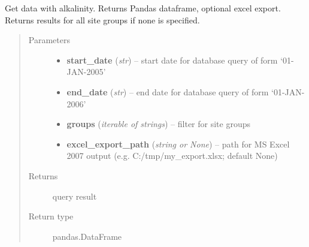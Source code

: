 \documentclass[letterpaper,10pt,english]{sphinxmanual}
\begin{document}
\begin{fulllineitems}
\begin{fulllineitems}
\begin{quote}
\begin{description}
\end{description}\end{quote}

\end{fulllineitems}


\begin{fulllineitems}
\label{modules:webb_utils.retrieve_data.RetrieveData.get_data_with_alkalinity}
Get data with alkalinity. Returns Pandas dataframe, optional excel export.
Returns results for all site groups if none is specified.
\begin{quote}\begin{description}
\item[{Parameters}] \leavevmode\begin{itemize}
\item {} 
\textbf{start\_date} (\emph{str}) -- start date for database query of form `01-JAN-2005'

\item {} 
\textbf{end\_date} (\emph{str}) -- end date for database query of form `01-JAN-2006'

\item {} 
\textbf{groups} (\emph{iterable of strings}) -- filter for site groups

\item {} 
\textbf{excel\_export\_path} (\emph{string or None}) -- path for MS Excel 2007 output (e.g. C:/tmp/my\_export.xlsx; default None)

\end{itemize}

\item[{Returns}] \leavevmode
query result

\item[{Return type}] \leavevmode
pandas.DataFrame

\end{description}\end{quote}

\end{fulllineitems}



\end{fulllineitems}
\end{document}
